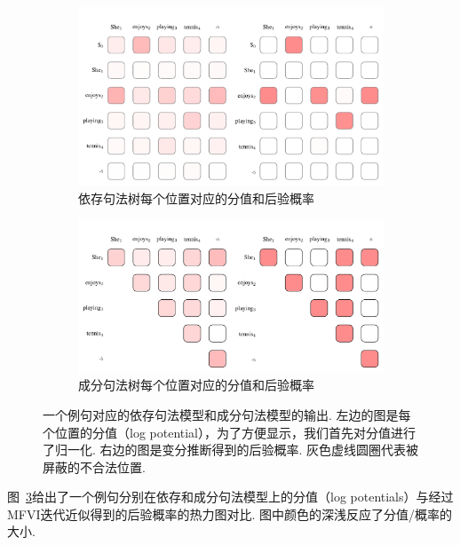 \begin{figure}[tb!]
  \centering
  \begin{subfigure}[b]{0.9\textwidth}
    \centering
    \includegraphics[scale=0.75]{figures/dep-probs.pdf}
    \caption{依存句法树每个位置对应的分值和后验概率}
    \label{fig:dep-probs}
  \end{subfigure}
  \begin{subfigure}[b]{0.9\textwidth}
    \centering
    \includegraphics[scale=0.75]{figures/con-probs.pdf}
    \caption{成分句法树每个位置对应的分值和后验概率}
    \label{fig:con-probs}
  \end{subfigure}
  \caption{一个例句对应的依存句法模型和成分句法模型的输出. 左边的图是每个位置的分值（log potential），为了方便显示，我们首先对分值进行了归一化.
    右边的图是变分推断得到的后验概率. 灰色虚线圆圈代表被屏蔽的不合法位置.}

  \label{fig:vi-probs}
\end{figure}

图~\ref{fig:vi-probs}给出了一个例句分别在依存和成分句法模型上的分值（log potentials）与经过MFVI迭代近似得到的后验概率的热力图对比.
图中颜色的深浅反应了分值/概率的大小.

